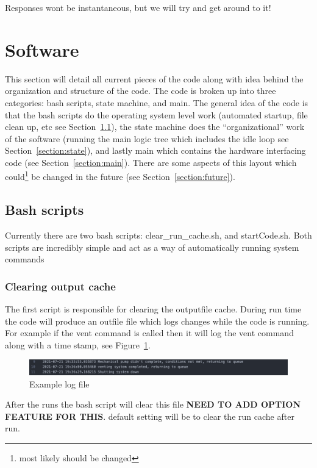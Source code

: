 \documentclass[titlepage]{article}
\begin{document}
Responses wont be instantaneous, but we will try and get around to it!

\section{Software}
\label{section:software}
This section will detail all current pieces of the code along with idea behind the organization and structure of the code. The code is broken up into three categories: bash scripts, state machine, and main. The general idea of the code is that the bash scripts do the operating system level work (automated startup, file clean up, etc see Section~\ref{section:bash}), the state machine does the ``organizational'' work of the software (running the main logic tree which includes the idle loop see Section~\ref{section:state}), and lastly main which contains the hardware interfacing code (see Section~\ref{section:main}). There are some aspects of this layout which could\footnote{most likely should be changed} be changed in the future (see Section~\ref{section:future}).

\subsection{Bash scripts}
\label{section:bash}
Currently there are two bash scripts: clear\_run\_cache.sh, and startCode.sh. Both scripts are incredibly simple and act as a way of automatically running system commands

\subsubsection{Clearing output cache}
The first script is responsible for clearing the outputfile cache. During run time the code will produce an outfile file which logs changes while the code is running. For example if the vent command is called then it will log the vent command along with a time stamp, see Figure~\ref{fig:logfile}. 
\begin{center}
    \begin{figure}[h!]
      \includegraphics[scale=0.4]{image1.png}
      \caption{Example log file}
      \label{fig:logfile}
    \end{figure}
\end{center}


After the runs the bash script will clear this file \textbf{NEED TO ADD OPTION FEATURE FOR THIS}. default setting will be to clear the run cache after run.\\
\end{document}
